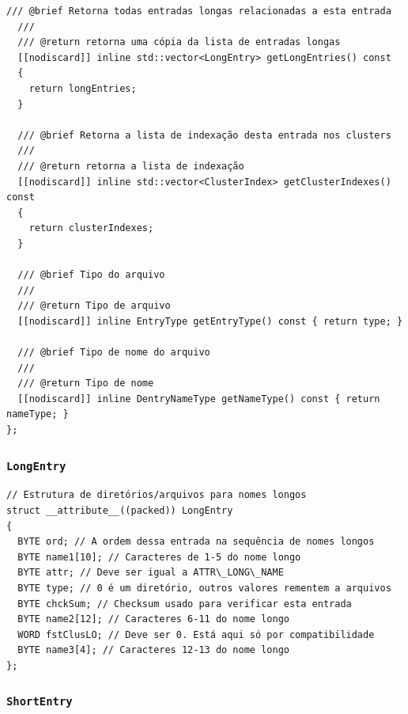 \documentclass[
    12pt,				%
    oneside,   	        %
    a4paper,			%
    english,			%
    french,				%
    spanish,			%
    brazil,				%
    ]{pacotes/abntex2}
\begin{document}
\begin{lstlisting}[caption={Classe que abstrai entradas longas e curtas em uma única interface}, label={lst:dentry}]
  /// @brief Retorna todas entradas longas relacionadas a esta entrada
  ///
  /// @return retorna uma cópia da lista de entradas longas
  [[nodiscard]] inline std::vector<LongEntry> getLongEntries() const
  {
    return longEntries;
  }

  /// @brief Retorna a lista de indexação desta entrada nos clusters
  ///
  /// @return retorna a lista de indexação
  [[nodiscard]] inline std::vector<ClusterIndex> getClusterIndexes() const
  {
    return clusterIndexes;
  }

  /// @brief Tipo do arquivo
  ///
  /// @return Tipo de arquivo
  [[nodiscard]] inline EntryType getEntryType() const { return type; }

  /// @brief Tipo de nome do arquivo
  ///
  /// @return Tipo de nome
  [[nodiscard]] inline DentryNameType getNameType() const { return nameType; }
};
\end{lstlisting}

\subsubsection{\texttt{LongEntry}}
\label{subsubsec:long_entry}

\begin{lstlisting}[caption={Estrutura que representa uma entrada longa no sistema de arquivos}, label={lst:longentry}] 
// Estrutura de diretórios/arquivos para nomes longos
struct __attribute__((packed)) LongEntry
{
  BYTE ord; // A ordem dessa entrada na sequência de nomes longos 
  BYTE name1[10]; // Caracteres de 1-5 do nome longo
  BYTE attr; // Deve ser igual a ATTR\_LONG\_NAME
  BYTE type; // 0 é um diretório, outros valores rementem a arquivos
  BYTE chckSum; // Checksum usado para verificar esta entrada
  BYTE name2[12]; // Caracteres 6-11 do nome longo
  WORD fstClusLO; // Deve ser 0. Está aqui só por compatibilidade
  BYTE name3[4]; // Caracteres 12-13 do nome longo
};
\end{lstlisting}

\subsubsection{\texttt{ShortEntry}}
\label{subsubsec:short_entry}
\end{document}
